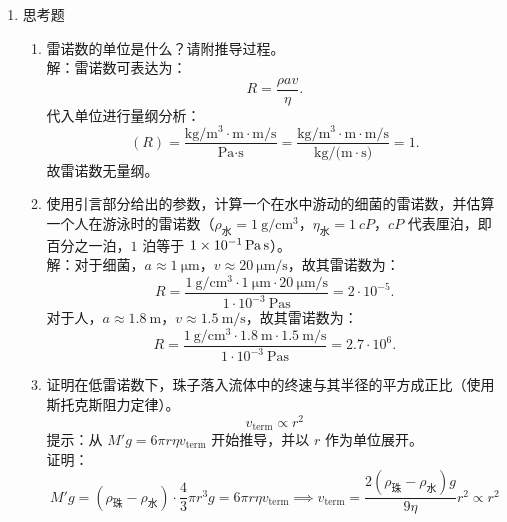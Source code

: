\documentclass[a4paper]{article}
\begin{document}
\begin{enumerate}[label=\chinese*.,left=0pt]
\begin{enumerate}[label=\Alph*., left=0pt]
        \textbf{误差分析：}首先，相较于在甘油中下落，钢珠在水中下落速度较快，较难判断铁球是否达到匀速状态，可能使得所测速度偏低；其次，在释放钢球的过程中，无法保证每次小球初始位置都恰好位于量筒中心，且其轨迹并不一定是竖直直线，因此壁效应修正公式未必准确适用；另外，本实验录制的视频帧数较低，无法准确观察钢珠重心的精确位置，尤其是尺寸较小的钢珠，因此从表中也可看出，钢珠尺寸越小，标准差反而越大。
    \end{enumerate}




    
    \item 思考题
    \begin{enumerate}[label=\arabic*.,left = 0pt]
        \item 雷诺数的单位是什么？请附推导过程。
        \\[2.5mm]
        解：雷诺数可表达为：
        $$R=\frac{\rho a v}{\eta}.$$
        代入单位进行量纲分析：
        $$(R)=\frac{\si{\kg \per \m \cubed \cdot \si{\m} \cdot \si{\m \per \s}}}{\si{\Pa \cdot \s}} = \frac{\si{\kg \per \m \cubed \cdot \si{\m} \cdot \si{\m \per \s}}}{\si{\kg \per (\m \cdot \s)}} = 1.$$
        故雷诺数无量纲。
    
        \item 使用引言部分给出的参数，计算一个在水中游动的细菌的雷诺数，并估算一个人在游泳时的雷诺数（$\rho_{\text{水}} = \qty{1}{\g \per \cm \cubed}$，$\eta_{\text{水}} = \qty{1}{cP}$，$\si{cP}$ 代表厘泊，即百分之一泊，$1$ 泊等于 $\qty{1d-1}{\Pa\s}$）。
        \\[2.5mm]
        解：对于细菌，$a\approx\qty{1}{\micro \metre}$，$v \approx \qty{20}{\micro \metre \per \second}$，故其雷诺数为：
        $$R=\frac{\qty{1}{\gram \per \cm \cubed} \cdot \qty{1}{\micro \metre} \cdot \qty{20}{\micro \metre \per \second}}{1\cdot 10^{-3} \qty{}{\Pa \second}}=2\cdot 10^{-5}.$$
        对于人，$a\approx \qty{1.8}{\m}$，$v\approx \qty{1.5}{\m \per \s}$，故其雷诺数为：
        $$R=\frac{\qty{1}{\gram \per \cm \cubed} \cdot \qty{1.8}{\metre} \cdot \qty{1.5}{\metre \per \second}}{1\cdot 10^{-3} \qty{}{\Pa \second}}=2.7 \cdot 10^6.$$
    
        \item 证明在低雷诺数下，珠子落入流体中的终速与其半径的平方成正比（使用斯托克斯阻力定律）。
        \begin{equation*}
            v_{\text{term}} \propto r^2
        \end{equation*}
        提示：从 $M' g = 6\pi r \eta v_{\text{term}}$ 开始推导，并以 $r$ 作为单位展开。
        \\[2.5mm]
        证明：
        $$M'g = (\rho_{\text{珠}}-\rho_{\text{水}}) \cdot \frac{4}{3} \pi r^3 g = 6\pi r \eta v_{\text{term}} \implies v_{\text{term}}= \frac{2(\rho_{\text{珠}}-\rho_{\text{水}})g}{9\eta} r^2 \propto r^2$$


\end{enumerate}
\end{enumerate}
\end{document}
